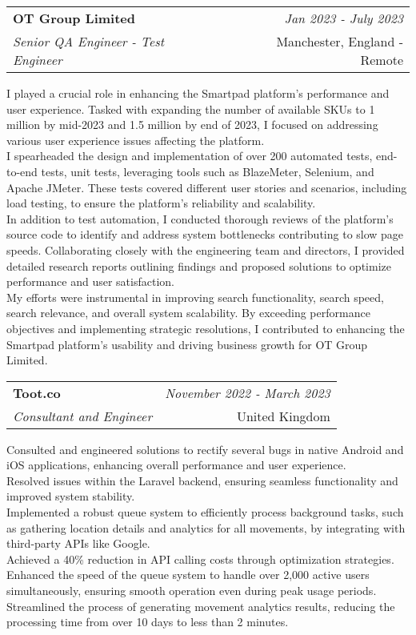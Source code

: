 \documentclass[a4paper,10pt]{article}
\makeatletter
\newcommand{\resumeSubheading}[4]{
	\vspace{0.5mm}\item
	\begin{tabular*}{0.98\textwidth}[t]{l@{\extracolsep{\fill}}r}
		\textbf{#1} & \textit{\footnotesize{#4}} \\
		\textit{\footnotesize{#3}} &  \footnotesize{#2}\\
	\end{tabular*}
	\vspace{-2.4mm}
}
\newcommand{\resumeItemListStart}{\begin{justify}\begin{itemize}[leftmargin=3ex, rightmargin=2ex, noitemsep,labelsep=1.2mm,itemsep=0mm]\small}
\newcommand{\resumeItemListEnd}{\end{itemize}\end{justify}\vspace{-2mm}}
\makeatother
\begin{document}
\vspace{-1mm}
\resumeSubheading
{OT Group Limited}{Manchester, England - Remote}
{Senior QA Engineer - Test Engineer}{Jan 2023 - July 2023}
\resumeItemListStart
I played a crucial role in enhancing the Smartpad platform's performance and user experience. Tasked with expanding the number of available SKUs to 1 million by mid-2023 and 1.5 million by end of 2023, I focused on addressing various user experience issues affecting the platform.\\
I spearheaded the design and implementation of over 200 automated tests, end-to-end tests, unit tests, leveraging tools such as BlazeMeter, Selenium, and Apache JMeter. These tests covered different user stories and scenarios, including load testing, to ensure the platform's reliability and scalability.\\
In addition to test automation, I conducted thorough reviews of the platform's source code to identify and address system bottlenecks contributing to slow page speeds. Collaborating closely with the engineering team and directors, I provided detailed research reports outlining findings and proposed solutions to optimize performance and user satisfaction.\\
My efforts were instrumental in improving search functionality, search speed, search relevance, and overall system scalability. By exceeding performance objectives and implementing strategic resolutions, I contributed to enhancing the Smartpad platform's usability and driving business growth for OT Group Limited.
\resumeItemListEnd

\vspace{-1mm}
\resumeSubheading
{Toot.co}{United Kingdom}
{Consultant and Engineer}{November 2022 - March 2023}
\resumeItemListStart
Consulted and engineered solutions to rectify several bugs in native Android and iOS applications, enhancing overall performance and user experience. \\
Resolved issues within the Laravel backend, ensuring seamless functionality and improved system stability. \\
Implemented a robust queue system to efficiently process background tasks, such as gathering location details and analytics for all movements, by integrating with third-party APIs like Google. \\
Achieved a 40\% reduction in API calling costs through optimization strategies. \\
Enhanced the speed of the queue system to handle over 2,000 active users simultaneously, ensuring smooth operation even during peak usage periods. \\
Streamlined the process of generating movement analytics results, reducing the processing time from over 10 days to less than 2 minutes.
\resumeItemListEnd
\end{document}
